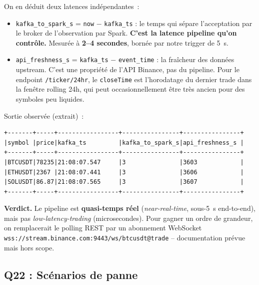 \documentclass{RapportINPTCLOUD}
\begin{document}
On en d\'{e}duit deux latences ind\'{e}pendantes~:

\begin{itemize}[leftmargin=2em]
    \item \texttt{kafka\_to\_spark\_s} = \texttt{now} $-$ \texttt{kafka\_ts} : le temps qui s\'{e}pare l'acceptation par le broker de l'observation par Spark. \textbf{C'est la latence pipeline qu'on contr\^{o}le.} Mesur\'{e}e \`{a} \textbf{2--4 secondes}, born\'{e}e par notre trigger de 5~s.
    \item \texttt{api\_freshness\_s} = \texttt{kafka\_ts} $-$ \texttt{event\_time} : la fra\^{i}cheur des donn\'{e}es upstream. C'est une propri\'{e}t\'{e} de l'API Binance, pas du pipeline. Pour le endpoint \texttt{/ticker/24hr}, le \texttt{closeTime} est l'horodatage du dernier trade dans la fen\^{e}tre rolling 24h, qui peut occasionnellement \^{e}tre tr\`{e}s ancien pour des symboles peu liquides.
\end{itemize}

Sortie observ\'{e}e (extrait)~:
\begin{lstlisting}[style=code]
+-------+-----+-----------------+----------------+----------------+
|symbol |price|kafka_ts         |kafka_to_spark_s|api_freshness_s |
+-------+-----+-----------------+----------------+----------------+
|BTCUSDT|78235|21:08:07.547     |3               |3603            |
|ETHUSDT|2367 |21:08:07.441     |3               |3606            |
|SOLUSDT|86.87|21:08:07.565     |3               |3607            |
+-------+-----+-----------------+----------------+----------------+
\end{lstlisting}

\textbf{Verdict.} Le pipeline est \textbf{quasi-temps r\'{e}el} (\textit{near-real-time}, sous-5~s end-to-end), mais pas \textit{low-latency-trading} (microsecondes). Pour gagner un ordre de grandeur, on remplacerait le polling REST par un abonnement WebSocket \texttt{wss://stream.binance.com:9443/ws/btcusdt@trade} -- documentation pr\'{e}vue mais hors scope.

\subsection{Q22 : Sc\'{e}narios de panne}
\end{document}
